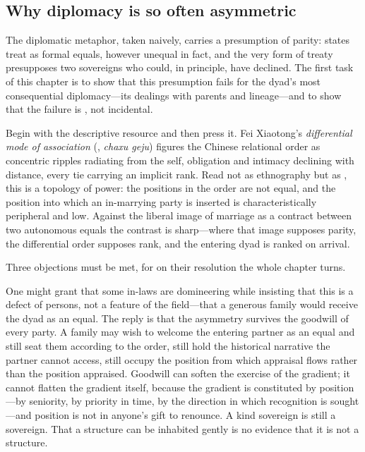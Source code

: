 \subsection{Why diplomacy is so often asymmetric}
The diplomatic metaphor, taken naively, carries a presumption of parity: states treat as formal equals, however unequal in fact, and the very form of treaty presupposes two sovereigns who could, in principle, have declined. The first task of this chapter is to show that this presumption fails for the dyad's most consequential diplomacy---its dealings with parents and lineage---and to show that the failure is , not incidental.

Begin with the descriptive resource and then press it. Fei Xiaotong's \emph{differential mode of association} (, \emph{chaxu geju}) \parencite{fei1947soil} figures the Chinese relational order as concentric ripples radiating from the self, obligation and intimacy declining with distance, every tie carrying an implicit rank. Read not as ethnography but as , this is a topology of power: the positions in the order are not equal, and the position into which an in-marrying party is inserted is characteristically peripheral and low. Against the liberal image of marriage as a contract between two autonomous equals the contrast is sharp---where that image supposes parity, the differential order supposes rank, and the entering dyad is ranked on arrival.

Three objections must be met, for on their resolution the whole chapter turns.

 One might grant that some in-laws are domineering while insisting that this is a defect of persons, not a feature of the field---that a generous family would receive the dyad as an equal. The reply is that the asymmetry survives the goodwill of every party. A family may wish to welcome the entering partner as an equal and still seat them according to the order, still hold the historical narrative the partner cannot access, still occupy the position from which appraisal flows rather than the position appraised. Goodwill can soften the exercise of the gradient; it cannot flatten the gradient itself, because the gradient is constituted by position---by seniority, by priority in time, by the direction in which recognition is sought---and position is not in anyone's gift to renounce. A kind sovereign is still a sovereign. That a structure can be inhabited gently is no evidence that it is not a structure.

